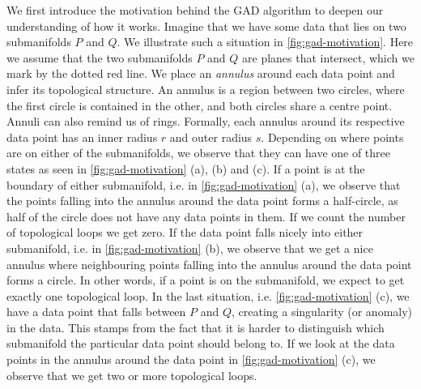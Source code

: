 We first introduce the motivation behind the GAD algorithm to deepen our understanding of how it works. Imagine that we have some data that lies on two submanifolds $P$ and $Q$. We illustrate such a situation in \cref{fig:gad-motivation}. Here we assume that the two submanifolds $P$ and $Q$ are planes that intersect, which we mark by the dotted red line. We place an \textit{annulus} around each data point and infer its topological structure. An annulus is a region between two circles, where the first circle is contained in the other, and both circles share a centre point. Annuli can also remind us of rings. Formally, each annulus around its respective data point has an inner radius $r$ and outer radius $s$. Depending on where points are on either of the submanifolds, we observe that they can have one of three states as seen in \cref{fig:gad-motivation} (a), (b) and (c). If a point is at the boundary of either submanifold, i.e. in \cref{fig:gad-motivation} (a), we observe that the points falling into the annulus around the data point forms a half-circle, as half of the circle does not have any data points in them. If we count the number of topological loops we get zero. If the data point falls nicely into either submanifold, i.e. in \cref{fig:gad-motivation} (b), we observe that we get a nice annulus where neighbouring points falling into the annulus around the data point forms a circle. In other words, if a point is on the submanifold, we expect to get exactly one topological loop. In the last situation, i.e. \cref{fig:gad-motivation} (c), we have a data point that falls between $P$ and $Q$, creating a singularity (or anomaly) in the data. This stamps from the fact that it is harder to distinguish which submanifold the particular data point should belong to. If we look at the data points in the annulus around the data point in \cref{fig:gad-motivation} (c), we observe that we get two or more topological loops.
